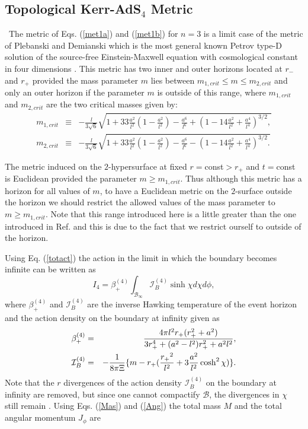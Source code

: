 \documentclass[a4paper,12pt,onecolumn]{revtex4}
\begin{document}
\subsection{Topological Kerr-AdS$_4$ Metric}

\ The metric of Eqs. (\ref{met1a}) and (\ref{met1b}) for $n=3$ is
a limit case of the metric of Plebanski and Demianski \cite{Pleb}
which is the most general known Petrov type-D solution of the
source-free Einstein-Maxwell equation with cosmological constant
in four dimensions \cite{Kl97}. This metric has two inner and
outer horizons located at $r_{-}$ and $r_{+}$ provided the mass
parameter $m$ lies between $m_{1,crit}\leq m\leq m_{2,crit} $ and
only an outer horizon if the parameter $m$ is outside of this
range, where $m_{1,crit}$ and $m_{2,crit}$ are the two critical
masses given by:
\begin{eqnarray}
m_{1,crit} &\equiv &-\frac l{3\sqrt{6}}\sqrt{1+33\frac{a^2}{l^2}(1-\frac{a^2%
}{l^2})-\frac{a^6}{l^6}+(1-14\frac{a^2}{l^2}+\frac{a^4}{l^4})^{3/2},}
\nonumber \\
m_{2,crit} &\equiv &-\frac l{3\sqrt{6}}\sqrt{1+33\frac{a^2}{l^2}(1-\frac{a^2%
}{l^2})-\frac{a^6}{l^6}-(1-14\frac{a^2}{l^2}+\frac{a^4}{l^4})^{3/2}.}
\label{mcrit}
\end{eqnarray}

The metric induced on the $2$-hypersurface at fixed $r
=$const$>r_{+}$ and $t=$const is Euclidean provided the parameter
$m\geq m_{1,crit}$. Thus although this metric has a horizon for
all values of $m$, to have a Euclidean metric on the $2$-surface
outside the horizon we should restrict the allowed values of the
mass parameter to $m\geq m_{1,crit}$. Note that this range
introduced here is a little greater than the one introduced in
Ref. \cite{Kl97} and this is due to the fact that we restrict
ourself to outside of the horizon.

Using Eq. (\ref{totact}) the action in the limit in which the
boundary becomes infinite can be written as
\begin{equation}
I_4=\beta _{+}^{(4)}\int_{\mathcal{B}_\infty }\mathcal{I}_B^{(4)}\sinh \chi
d\chi d\phi ,  \label{At4}
\end{equation}
where $\beta _{+}^{(4)}$ and $\mathcal{I}_B^{(4)}$ are the inverse
Hawking temperature of the event horizon and the action density on
the boundary at infinity given as
\begin{eqnarray}
\beta _{+}^{(4)} &=&\frac{4\pi l^2r_{+}(r_{+}^2+a^2)}{%
3r_{+}^4+(a^2-l^2)r_{+}^2+a^2l^2},  \label{bet4} \\
\mathcal{I}_B^{(4)} &=&-\frac 1{8\pi \Xi }\{m-r_{+}(\frac{r_{+}{}^2}{l^2}+3%
\frac{a^2}{l^2}\cosh ^2\chi )\}.  \label{Aden4}
\end{eqnarray}
Note that the $r$ divergences of the action density
$\mathcal{I}_B^{(4)}$ on
the boundary at infinity are removed, but since one cannot compactify $%
\mathcal{B}$, the divergences in $\chi $ still remain \cite{Kl98}.
Using Eqs. (\ref{Mas}) and (\ref{Ang}) the total mass $M$ and the
total angular momentum $J_\phi $ are
\end{document}
